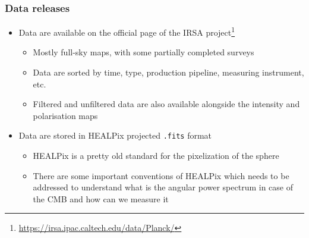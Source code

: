 \begin{frame}
\frametitle{Data releases}

\begin{itemize}
	\item<1-> Data are available on the official page of the IRSA project\footnote{\url{https://irsa.ipac.caltech.edu/data/Planck/}}
	\begin{itemize}
		\item<1-> Mostly full-sky maps, with some partially completed surveys
		\item<1-> Data are sorted by time, type, production pipeline, measuring instrument, etc.
		\item<1-> Filtered and unfiltered data are also available alongside the intensity and polarisation maps
	\end{itemize}
	\item<2-> Data are stored in HEALPix projected \texttt{.fits} format
	\begin{itemize}
		\item<2-> HEALPix is a pretty old standard for the pixelization of the sphere
		\item<2-> There are some important conventions of HEALPix which needs to be addressed to understand what is the angular power spectrum in case of the CMB and how can we measure it
	\end{itemize}	
\end{itemize}

\end{frame}